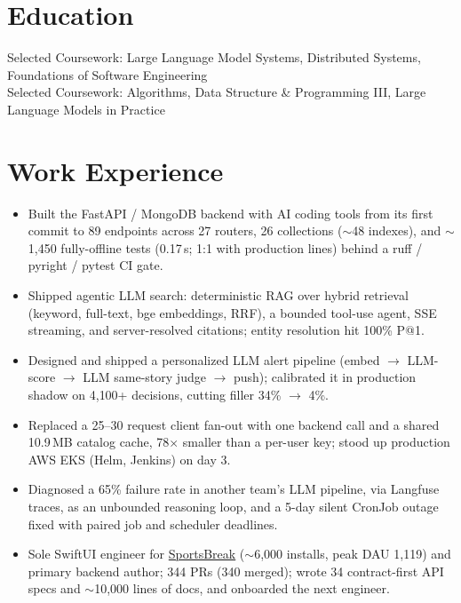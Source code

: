 \documentclass[11pt, letterpaper]{article}
\begin{document}

\section{Education}
Selected Coursework: Large Language Model Systems, Distributed Systems, Foundations of Software Engineering\\[1pt]
Selected Coursework: Algorithms, Data Structure \& Programming III, Large Language Models in Practice

\section{Work Experience}
\begin{itemize}
  \item Built the FastAPI / MongoDB backend with AI coding tools from its first commit to 89 endpoints across 27 routers, 26 collections ($\sim$48 indexes), and $\sim$1{,}450 fully-offline tests (0.17\,s; 1:1 with production lines) behind a ruff / pyright / pytest CI gate.
  \item Shipped agentic LLM search: deterministic RAG over hybrid retrieval (keyword, full-text, bge embeddings, RRF), a bounded tool-use agent, SSE streaming, and server-resolved citations; entity resolution hit 100\% P@1.
  \item Designed and shipped a personalized LLM alert pipeline (embed $\to$ LLM-score $\to$ LLM same-story judge $\to$ push); calibrated it in production shadow on 4{,}100+ decisions, cutting filler 34\% $\to$ 4\%.
  \item Replaced a 25--30 request client fan-out with one backend call and a shared 10.9\,MB catalog cache, 78$\times$ smaller than a per-user key; stood up production AWS EKS (Helm, Jenkins) on day 3.
  \item Diagnosed a 65\% failure rate in another team's LLM pipeline, via Langfuse traces, as an unbounded reasoning loop, and a 5-day silent CronJob outage fixed with paired job and scheduler deadlines.
  \item Sole SwiftUI engineer for \href{https://apps.apple.com/app/id6762649287}{SportsBreak} ($\sim$6{,}000 installs, peak DAU 1{,}119) and primary backend author; 344 PRs (340 merged); wrote 34 contract-first API specs and $\sim$10{,}000 lines of docs, and onboarded the next engineer.
\end{itemize}
\end{document}
